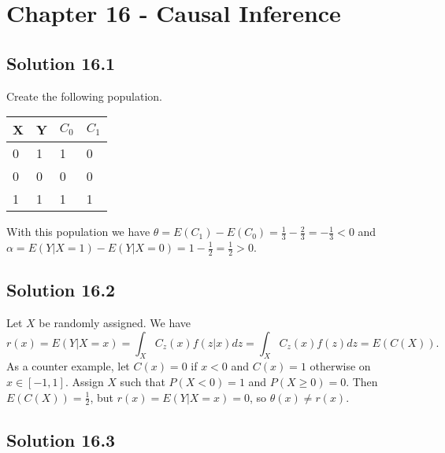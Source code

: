 \section*{Chapter 16 - Causal Inference}

\subsection*{Solution 16.1}

Create the following population.

\begin{table}[H]
\begin{tabular}{l|l||l|l}
X & Y & $C_0$ & $C_1$ \\ \hline \hline
0 & 1 & 1    & 0    \\ \hline
0 & 0 & 0    & 0    \\ \hline
1 & 1 & 1    & 1
\end{tabular}
\end{table}
With this population we have $\theta = E(C_1) - E(C_0) = \frac{1}{3} - \frac{2}{3} = -\frac{1}{3} < 0$ and $\alpha = E(Y|X=1) - E(Y|X=0) = 1 - \frac{1}{2} = \frac{1}{2} > 0$.


\subsection*{Solution 16.2}

Let $X$ be randomly assigned.
We have
\begin{equation*}
    r(x) = E(Y|X = x)
        = \int_{X} C_{z}(x) f(z|x) dz
        = \int_{X} C_{z}(x) f(z) dz
        = E(C(X)).
\end{equation*}
As a counter example, let $C(x) = 0$ if $x < 0$ and $C(x) = 1$ otherwise on $x \in [-1, 1]$.
Assign $X$ such that $P(X < 0) = 1$ and $P(X \geq 0) = 0$.
Then $E(C(X)) = \frac{1}{2}$, but $r(x) = E(Y|X = x) = 0$, so $\theta(x) \neq r(x)$.


\subsection*{Solution 16.3}

